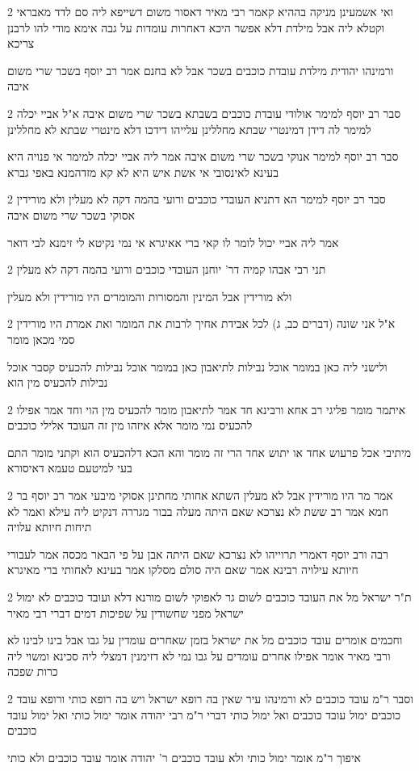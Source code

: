 \documentclass[12pt, openany]{book}
\newcommand{\sethebfont}{
\fontsize{10.5pt}{21.0pt} \selectfont
}
\newcommand{\twocol}[1]{
	{\sethebfont \begin{multicols}{2}
			#1
	\end{multicols}}	
}
\begin{document}
\twocol{ואי אשמעינן מניקה בההיא קאמר רבי מאיר דאסור משום דשייפא ליה סם לדד מאבראי וקטלא ליה אבל מילדת דלא אפשר היכא דאחרות עומדות על גבה אימא מודי להו לרבנן צריכא
\par ורמינהו יהודית מילדת עובדת כוכבים בשכר אבל לא בחנם אמר רב יוסף בשכר שרי משום איבה}
\twocol{סבר רב יוסף למימר אולודי עובדת כוכבים בשבתא בשכר שרי משום איבה א"ל אביי יכלה למימר לה דידן דמינטרי שבתא מחללינן עלייהו דידכו דלא מינטרי שבתא לא מחללינן
\par סבר רב יוסף למימר אנוקי בשכר שרי משום איבה אמר ליה אביי יכלה למימר אי פנויה היא בעינא לאינסובי אי אשת איש היא לא קא מזדהמנא באפי גברא}
\twocol{סבר רב יוסף למימר הא דתניא העובדי כוכבים ורועי בהמה דקה לא מעלין ולא מורידין אסוקי בשכר שרי משום איבה
\par אמר ליה אביי יכול לומר לו קאי ברי אאיגרא אי נמי נקיטא לי זימנא לבי דואר}
\twocol{תני רבי אבהו קמיה דר' יוחנן העובדי כוכבים ורועי בהמה דקה לא מעלין
\par ולא מורידין אבל המינין והמסורות והמומרים היו מורידין ולא מעלין}
\twocol{א"ל אני שונה (דברים כב, ג) לכל אבידת אחיך לרבות את המומר ואת אמרת היו מורידין סמי מכאן מומר
\par ולישני ליה כאן במומר אוכל נבילות לתיאבון כאן במומר אוכל נבילות להכעיס קסבר אוכל נבילות להכעיס מין הוא}
\twocol{איתמר מומר פליגי רב אחא ורבינא חד אמר לתיאבון מומר להכעיס מין הוי וחד אמר אפילו להכעיס נמי מומר אלא איזהו מין זה העובד אלילי כוכבים
\par מיתיבי אכל פרעוש אחד או יתוש אחד הרי זה מומר והא הכא דלהכעיס הוא וקתני מומר התם בעי למיטעם טעמא דאיסורא}
\twocol{אמר מר היו מורידין אבל לא מעלין השתא אחותי מחתינן אסוקי מיבעי אמר רב יוסף בר חמא אמר רב ששת לא נצרכא שאם היתה מעלה בבור מגררה דנקיט ליה עילא ואמר לא תיחות חיותא עלויה
\par רבה ורב יוסף דאמרי תרוייהו לא נצרכא שאם היתה אבן על פי הבאר מכסה אמר לעבורי חיותא עילויה רבינא אמר שאם היה סולם מסלקו אמר בעינא לאחותי ברי מאיגרא}
\twocol{ת"ר ישראל מל את העובד כוכבים לשום גר לאפוקי לשום מורנא דלא ועובד כוכבים לא ימול ישראל מפני שחשודין על שפיכות דמים דברי רבי מאיר
\par וחכמים אומרים עובד כוכבים מל את ישראל בזמן שאחרים עומדין על גבו אבל בינו לבינו לא ורבי מאיר אומר אפילו אחרים עומדים על גבו נמי לא דזימנין דמצלי ליה סכינא ומשוי ליה כרות שפכה}
\twocol{וסבר ר"מ עובד כוכבים לא ורמינהו עיר שאין בה רופא ישראל ויש בה רופא כותי ורופא עובד כוכבים ימול עובד כוכבים ואל ימול כותי דברי ר"מ רבי יהודה אומר ימול כותי ואל ימול עובד כוכבים
\par איפוך ר"מ אומר ימול כותי ולא עובד כוכבים ר' יהודה אומר עובד כוכבים ולא כותי}
\end{document}
